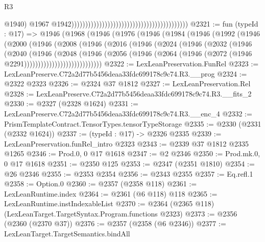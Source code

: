 \begin{lexlean}{R3}
\begin{coremodule}
                                                                                          @1940)
                                                                                        @1967
                                                                                        @1942))))))))))))))))))))))))))))))))))))))))))
@2321 := fun (typeId : @17) =>
  @1946
    (@1968
      (@1946
        (@1976
          (@1946
            (@1984
              (@1946
                (@1992
                  (@1946
                    (@2000
                      (@1946
                        (@2008
                          (@1946
                            (@2016
                              (@1946
                                (@2024
                                  (@1946
                                    (@2032
                                      (@1946
                                        (@2040
                                          (@1946
                                            (@2048
                                              (@1946
                                                (@2056
                                                  (@1946
                                                    (@2064
                                                      (@1946
                                                        (@2072
                                                          (@1946 @2291))))))))))))))))))))))))))))
@2322 := LexLeanPreservation.FunRel
@2323 := LexLeanPreserve.C72a2d77b5456deaa33fdc699178c9c74.R3.__prog
@2324 := @2322 @2323
@2326 := @2324 @37 @1812
@2327 := LexLeanPreservation.Rel
@2328 := LexLeanPreserve.C72a2d77b5456deaa33fdc699178c9c74.R3.__fits_2
@2330 := @2327 (@2328 @1624)
@2331 := LexLeanPreserve.C72a2d77b5456deaa33fdc699178c9c74.R3.__enc_4
@2332 := PrismTemplateContract.TensorTypes.tensorTypeStorage
@2335 := @2330 (@2331 (@2332 @1624))
@2337 := (typeId : @17) -> @2326 @2335
@2339 := LexLeanPreservation.funRel_intro @2323
@2343 := @2339 @37 @1812 @2335 @1265
@2346 := Prod.{0, 0} @17 @1618
@2347 := @2 @2346
@2350 := Prod.mk.{0, 0} @17 @1618
@2351 := @2350 @125
@2353 := @2347 (@2351 @1810)
@2354 := @26 @2346
@2355 := @2353 @2354
@2356 := @2343 @2355
@2357 := Eq.refl.{1}
@2358 := Option.{0}
@2360 := @2357 (@2358 @118)
@2361 := LexLeanRuntime.index
@2364 := @2361 (@6 @118) @118
@2365 := LexLeanRuntime.instIndexableList
@2370 := @2364 (@2365 @118) (LexLeanTarget.TargetSyntax.Program.functions @2323)
@2373 := @2356 (@2360 (@2370 @37))
@2376 := @2357 (@2358 (@6 @2346))
@2377 := LexLeanTarget.TargetSemantics.bindAll

\end{coremodule}
\end{lexlean}
